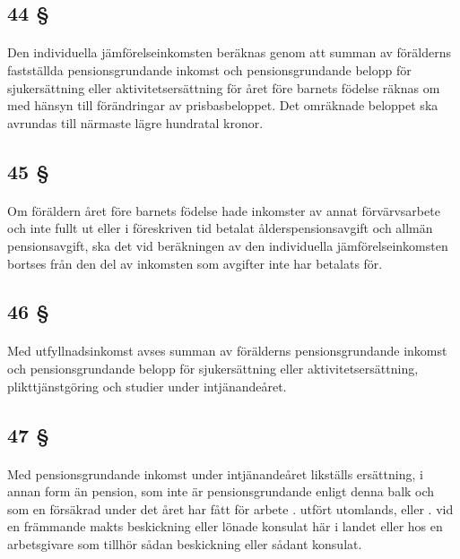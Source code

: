 \documentclass[a4paper,notitlepage,openany,10pt]{book}
\begin{document}
\subsection*{44 §}
\paragraph*{}
Den individuella jämförelseinkomsten beräknas genom att summan av förälderns fastställda pensionsgrundande inkomst och pensionsgrundande belopp för sjukersättning eller aktivitetsersättning för året före barnets födelse räknas om med hänsyn till förändringar av prisbasbeloppet. Det omräknade beloppet ska avrundas till närmaste lägre hundratal kronor.
\subsection*{45 §}
\paragraph*{}
Om föräldern året före barnets födelse hade inkomster av annat förvärvsarbete och inte fullt ut eller i föreskriven tid betalat ålderspensionsavgift och allmän pensionsavgift, ska det vid beräkningen av den individuella jämförelseinkomsten bortses från den del av inkomsten som avgifter inte har betalats för.
\subsection*{46 §}
\paragraph*{}
Med utfyllnadsinkomst avses summan av förälderns pensionsgrundande inkomst och pensionsgrundande belopp för sjukersättning eller aktivitetsersättning, plikttjänstgöring och studier under intjänandeåret.
\subsection*{47 §}
\paragraph*{}
Med pensionsgrundande inkomst under intjänandeåret likställs ersättning, i annan form än pension, som inte är pensionsgrundande enligt denna balk och som en försäkrad under det året har fått för arbete
. utfört utomlands, eller
. vid en främmande makts beskickning eller lönade konsulat här i landet eller hos en arbetsgivare som tillhör sådan beskickning eller sådant konsulat.
\end{document}
